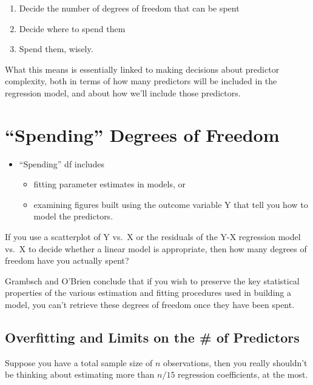 \documentclass[]{book}
\providecommand{\tightlist}{%
  \setlength{\itemsep}{0pt}\setlength{\parskip}{0pt}}
\theoremstyle{definition}
\theoremstyle{definition}
\theoremstyle{definition}
\theoremstyle{remark}
\begin{document}
\begin{enumerate}
\def\labelenumi{\arabic{enumi}.}
\tightlist
\item
  Decide the number of degrees of freedom that can be spent
\item
  Decide where to spend them
\item
  Spend them, wisely.
\end{enumerate}

What this means is essentially linked to making decisions about
predictor complexity, both in terms of how many predictors will be
included in the regression model, and about how we'll include those
predictors.

\section{\texorpdfstring{``Spending'' Degrees of
Freedom}{Spending Degrees of Freedom}}\label{spending-degrees-of-freedom}

\begin{itemize}
\tightlist
\item
  ``Spending'' df includes

  \begin{itemize}
  \tightlist
  \item
    fitting parameter estimates in models, or
  \item
    examining figures built using the outcome variable Y that tell you
    how to model the predictors.
  \end{itemize}
\end{itemize}

If you use a scatterplot of Y vs.~X or the residuals of the Y-X
regression model vs.~X to decide whether a linear model is appropriate,
then how many degrees of freedom have you actually spent?

Grambsch and O'Brien conclude that if you wish to preserve the key
statistical properties of the various estimation and fitting procedures
used in building a model, you can't retrieve these degrees of freedom
once they have been spent.

\subsection{Overfitting and Limits on the \# of
Predictors}\label{overfitting-and-limits-on-the-of-predictors}

Suppose you have a total sample size of \(n\) observations, then you
really shouldn't be thinking about estimating more than \(n / 15\)
regression coefficients, at the most.
\end{document}

